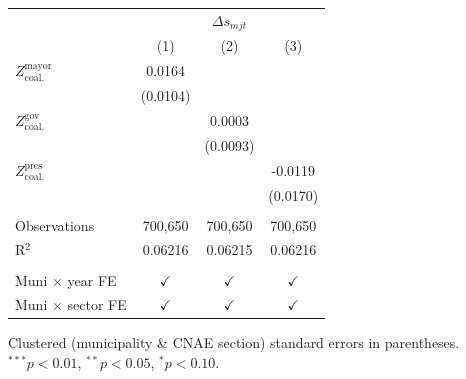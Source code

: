 \begingroup
\centering
\begin{tabular}{lccc}
   \toprule
    & \multicolumn{3}{c}{$\Delta s_{mjt}$}\\
                                       & (1)           & (2)           & (3)\\  
   \midrule 
   $Z^{\text{mayor}}_{\text{coal.}}$   & 0.0164        &               &   \\   
                                       & (0.0104)      &               &   \\   
   $Z^{\text{gov}}_{\text{coal.}}$     &               & 0.0003        &   \\   
                                       &               & (0.0093)      &   \\   
   $Z^{\text{pres}}_{\text{coal.}}$    &               &               & -0.0119\\   
                                       &               &               & (0.0170)\\   
    \\
   Observations                        & 700,650       & 700,650       & 700,650\\  
   R$^2$                               & 0.06216       & 0.06215       & 0.06216\\  
    \\
   Muni $\times$ year FE               & $\checkmark$  & $\checkmark$  & $\checkmark$\\   
   Muni $\times$ sector FE             & $\checkmark$  & $\checkmark$  & $\checkmark$\\   
   \bottomrule
\end{tabular}
 
\par \raggedright 
Clustered (municipality \& CNAE section) standard errors in parentheses. $^{***}p<0.01$, $^{**}p<0.05$, $^{*}p<0.10$.
\par\endgroup
